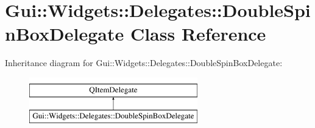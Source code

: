 \hypertarget{classGui_1_1Widgets_1_1Delegates_1_1DoubleSpinBoxDelegate}{\section{Gui\-:\-:Widgets\-:\-:Delegates\-:\-:Double\-Spin\-Box\-Delegate Class Reference}
\label{classGui_1_1Widgets_1_1Delegates_1_1DoubleSpinBoxDelegate}
}
Inheritance diagram for Gui\-:\-:Widgets\-:\-:Delegates\-:\-:Double\-Spin\-Box\-Delegate\-:\begin{figure}[H]
\begin{center}
\leavevmode
\includegraphics[height=2.000000cm]{da/d53/classGui_1_1Widgets_1_1Delegates_1_1DoubleSpinBoxDelegate}
\end{center}
\end{figure}
